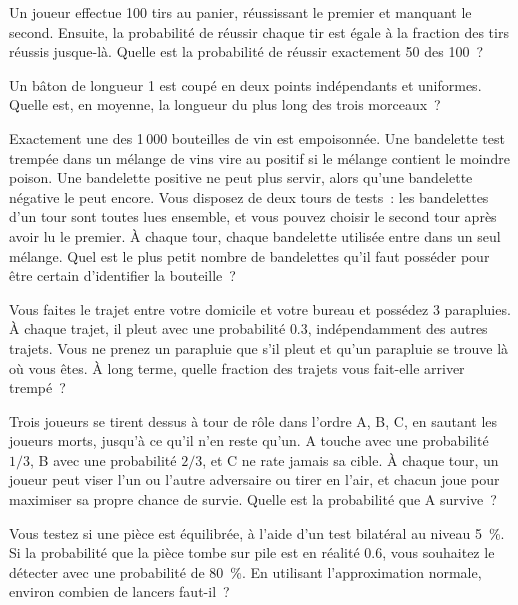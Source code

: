 
\begin{question}\label{iq:iv1:timed-test-1:7}
Un joueur effectue 100 tirs au panier, réussissant le premier et manquant le second. Ensuite, la probabilité de réussir chaque tir est égale à la fraction des tirs réussis jusque-là. Quelle est la probabilité de réussir exactement 50 des 100~?
\end{question}

\begin{question}\label{iq:iv1:timed-test-1:8}
Un bâton de longueur 1 est coupé en deux points indépendants et uniformes. Quelle est, en moyenne, la longueur du plus long des trois morceaux~?
\end{question}

\begin{question}\label{iq:iv1:timed-test-1:9}
Exactement une des 1\,000 bouteilles de vin est empoisonnée. Une bandelette test trempée dans un mélange de vins vire au positif si le mélange contient le moindre poison. Une bandelette positive ne peut plus servir, alors qu'une bandelette négative le peut encore. Vous disposez de deux tours de tests~: les bandelettes d'un tour sont toutes lues ensemble, et vous pouvez choisir le second tour après avoir lu le premier. À chaque tour, chaque bandelette utilisée entre dans un seul mélange. Quel est le plus petit nombre de bandelettes qu'il faut posséder pour être certain d'identifier la bouteille~?
\end{question}

\begin{question}\label{iq:iv1:timed-test-1:10}
Vous faites le trajet entre votre domicile et votre bureau et possédez 3 parapluies. À chaque trajet, il pleut avec une probabilité $0.3$, indépendamment des autres trajets. Vous ne prenez un parapluie que s'il pleut et qu'un parapluie se trouve là où vous êtes. À long terme, quelle fraction des trajets vous fait-elle arriver trempé~?
\end{question}

\begin{question}\label{iq:iv1:timed-test-1:11}
Trois joueurs se tirent dessus à tour de rôle dans l'ordre A, B, C, en sautant les joueurs morts, jusqu'à ce qu'il n'en reste qu'un. A touche avec une probabilité $1/3$, B avec une probabilité $2/3$, et C ne rate jamais sa cible. À chaque tour, un joueur peut viser l'un ou l'autre adversaire ou tirer en l'air, et chacun joue pour maximiser sa propre chance de survie. Quelle est la probabilité que A survive~?
\end{question}

\begin{question}\label{iq:iv1:timed-test-1:12}
Vous testez si une pièce est équilibrée, à l'aide d'un test bilatéral au niveau 5~\%. Si la probabilité que la pièce tombe sur pile est en réalité $0.6$, vous souhaitez le détecter avec une probabilité de 80~\%. En utilisant l'approximation normale, environ combien de lancers faut-il~?
\end{question}
